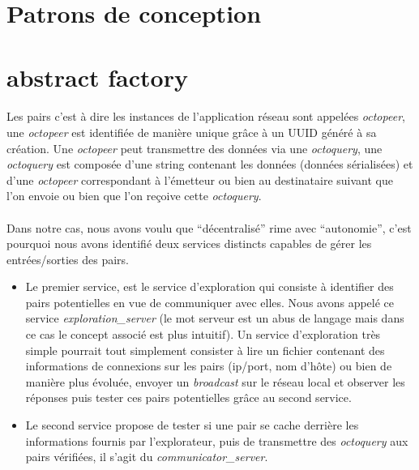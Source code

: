 \documentclass[a4paper]{article}
\begin{document}
		\newpage

	\section{Patrons de conception}
	
		\section{abstract factory}
		
			\paragraph{}{
			Les pairs c’est à dire les instances de l’application réseau sont appelées \textit{octopeer}, 
			une \textit{octopeer} est identifiée de manière unique grâce à un UUID généré à sa création. \newline
			Une \textit{octopeer} peut transmettre des données via une \textit{octoquery}, une \textit{octoquery} est composée
			 d’une string contenant les données (données sérialisées) et d’une \textit{octopeer} correspondant à 
			 l’émetteur ou bien au destinataire suivant que l’on envoie ou bien que l’on reçoive cette \textit{octoquery}.
			}
			
			\paragraph{}{
			Dans notre cas, nous avons voulu que “décentralisé” rime avec “autonomie”, c’est pourquoi nous 
			avons identifié deux services distincts capables de gérer les entrées/sorties des pairs.
			}
			\begin{itemize}
				\item Le premier service, est le service d’exploration qui consiste à identifier des pairs
				potentielles en vue de communiquer avec elles. Nous avons appelé ce service \textit{exploration\_server} 
				(le mot serveur est un abus de langage mais dans ce cas le concept associé est plus intuitif). 
				Un service d’exploration très simple pourrait tout simplement consister à lire un fichier contenant
				des informations de connexions sur les pairs (ip/port, nom d’hôte) ou bien de manière plus évoluée, 
				envoyer un \textit{broadcast} sur le réseau local et observer les réponses puis tester ces pairs potentielles 
				grâce au second service.
				
				\item Le second service propose de tester si une pair se cache derrière les informations fournis 
				par l’explorateur, puis de transmettre des \textit{octoquery} aux pairs vérifiées, il s’agit du \textit{communicator\_server}.
			\end{itemize}
			
\end{document}
